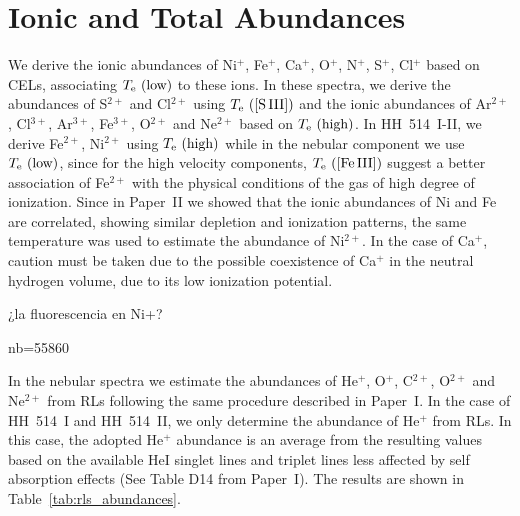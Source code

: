 \documentclass[fleqn,usenatbib]{mnras}
\begin{document}
\section{Ionic and Total Abundances}
\label{sec:ionic_total_abundances}

We derive the ionic abundances of Ni$^{+}$, Fe$^{+}$, Ca$^{+}$, O$^{+}$, N$^{+}$, S$^{+}$, Cl$^{+}$ based on CELs, associating $T_{\rm e} \text{ (low)}$ to these ions. In these spectra, we derive the abundances of S$^{2+}$ and Cl$^{2+}$ using $T_{\rm e} \text{ ([S\thinspace III])}$ and the ionic abundances of Ar$^{2+}$, Cl$^{3+}$, Ar$^{3+}$, Fe$^{3+}$, O$^{2+}$ and Ne$^{2+}$ based on $T_{\rm e} \text{ (high)}$. In HH~514~I-II, we derive Fe$^{2+}$, Ni$^{2+}$ using $T_{\rm e} \text{ (high)}$ while in the nebular component we use $T_{\rm e} \text{ (low)}$, since for the high velocity components, $T_{\rm e} \text{ ([Fe\thinspace III])}$ suggest a better association of Fe$^{2+}$ with the physical conditions of the gas of high degree of ionization. Since in Paper~II we showed that the ionic abundances of Ni and Fe are correlated, showing similar depletion and ionization patterns, the same temperature was used to estimate the abundance of Ni$^{2+}$. In the case of Ca$^+$, caution must be taken due to the possible coexistence of Ca$^+$ in the neutral hydrogen volume, due to its low ionization potential.



¿la fluorescencia en Ni+?


nb=55860






In the nebular spectra we estimate the abundances of He$^{+}$, O$^{+}$, C$^{2+}$, O$^{2+}$ and Ne$^{2+}$ from RLs following the same procedure described in Paper~I. In the case of HH~514~I and HH~514~II, we only determine the abundance of He$^{+}$ from RLs. In this case, the adopted He$^{+}$ abundance is an average from the resulting values based on the available He\thinspace I singlet lines and triplet lines less affected by self absorption effects (See Table D14 from Paper~I). The results are shown in Table~\ref{tab:rls_abundances}. 
\end{document}
